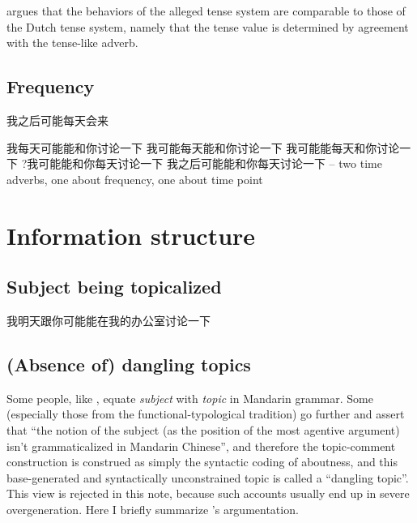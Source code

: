 \documentclass[UTF8, a4paper, oneside, scheme=plain, 12pt]{ctexrep}
\newcommand*{\citesec}[1]{\S~{#1}}
\newcommand*{\term}[1]{\emph{#1}}
\begin{document}
\citet{sybesma2007whether} argues that the behaviors of the alleged tense system
are comparable to those of the Dutch tense system,
namely that the tense value is determined by agreement with the tense-like adverb.

\section{Frequency}

\begin{exe}
    \ex 我之后可能每天会来 

    \ex *我每天可能能和你讨论一下
    \ex 我可能每天能和你讨论一下 
    \ex 我可能能每天和你讨论一下 
    \ex ?我可能能和你每天讨论一下
    \ex 我之后可能能和你每天讨论一下 -- two time adverbs, one about frequency, one about time point 
\end{exe}

\chapter{Information structure}

\section{Subject being topicalized}\label{sec:topic.subject}

\begin{exe}
    \ex 我明天跟你可能能在我的办公室讨论一下
\end{exe}

\section{(Absence of) dangling topics}\label{sec:topic-subject}

Some people, like \citet[\citesec{7.1}]{zhudexigrammar},
equate \term{subject} with \term{topic} in Mandarin grammar.
Some (especially those from the functional-typological tradition) go further 
and assert that ``the notion of the subject (as the position of the most agentive argument) 
isn't grammaticalized in Mandarin Chinese'',
and therefore the topic-comment construction 
is construed as simply the syntactic coding of aboutness,
and this base-generated and syntactically unconstrained topic 
is called a ``dangling topic''.
This view is rejected in this note,
because such accounts usually end up in severe overgeneration. 
Here I briefly summarize \citet{sih2000topic}'s argumentation.
\end{document}
